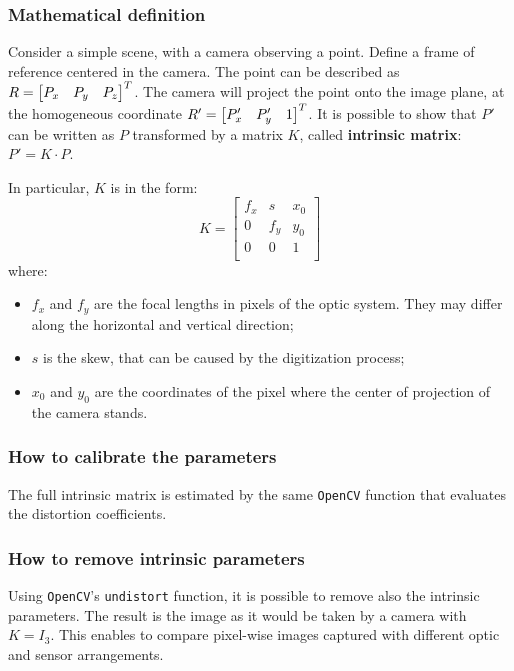 \subsubsection{Mathematical definition}

Consider a simple scene, with a camera observing a point.
Define a frame of reference centered in the camera.
The point can be described as $R=\begin{bmatrix} P_x & P_y & P_z \end{bmatrix}^T$.
The camera will project the point onto the image plane, at the homogeneous coordinate $R'=\begin{bmatrix} P_x' & P_y' & 1 \end{bmatrix}^T$.
It is possible to show that $P'$ can be written as $P$ transformed by a matrix $K$, called \textbf{intrinsic matrix}: $P' = K{\cdot}P$.

In particular, $K$ is in the form:
\begin{equation}
	K = \begin{bmatrix}
		f_x & s   & x_0 \\
		0   & f_y & y_0 \\
		0   & 0   & 1   \\
	\end{bmatrix}
\end{equation}
where:
\begin{itemize}
	\itemsep 0em
	\item $f_x$ and $f_y$ are the focal lengths in pixels of the optic system. They may differ along the horizontal and vertical direction;
	\item $s$ is the skew, that can be caused by the digitization process;
	\item $x_0$ and $y_0$ are the coordinates of the pixel where the center of projection of the camera stands.
\end{itemize}

\subsubsection{How to calibrate the parameters}

The full intrinsic matrix is estimated by the same \texttt{OpenCV} function that evaluates the distortion coefficients.

\subsubsection{How to remove intrinsic parameters}
Using \texttt{OpenCV}'s \texttt{undistort} function, it is possible to remove also the intrinsic parameters.
The result is the image as it would be taken by a camera with $K{=}I_3$.
This enables to compare pixel-wise images captured with different optic and sensor arrangements.


